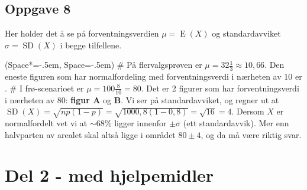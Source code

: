 \subsection*{Oppgave 8}
Her holder det å se på forventningsverdien $\mu = \operatorname{E}(X)$ og standardavviket $\sigma = \operatorname{SD}(X)$ i begge tilfellene.
\begin{easylist}[itemize]
	\ListProperties(Space*=-.5em, Space=-.5em)
	# På flervalgsprøven er $\mu = 32 \frac{1}{3} \approx 10,66$. Den eneste figuren som har normalfordeling med forventningsverdi i nærheten av $10$ er .
	# I frø-scenarioet er $\mu = 100 \frac{8}{10} = 80$. Det er 2 figurer som har forventningsverdi i nærheten av $80$: \textbf{figur A} og \textbf{B}. Vi ser på standardavviket, og regner ut at  $\operatorname{SD}(X) = \sqrt{n p (1- p)} = \sqrt{100 0,8 (1- 0,8)} = \sqrt{16} = 4$. Dersom $X$ er normalfordelt vet vi at $\sim 68 \%$ ligger innenfor $\pm \sigma$ (ett standardavvik). Mer enn halvparten av arealet skal altså ligge i området $80 \pm 4$, og da må  være riktig svar.
\end{easylist}




\section*{Del 2 - med hjelpemidler}
